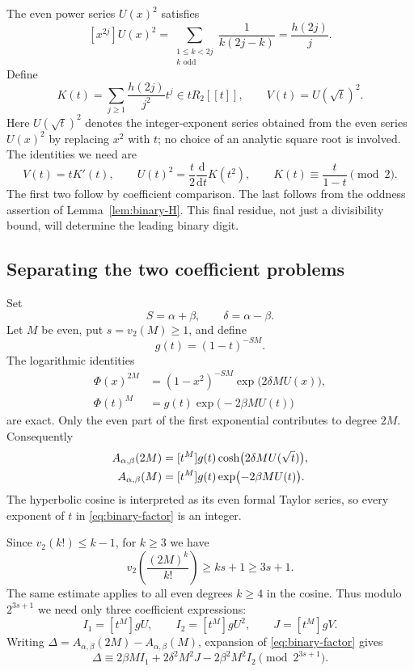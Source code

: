 \documentclass[11pt,a4paper]{article}
\numberwithin{equation}{section}
\theoremstyle{definition}
\theoremstyle{remark}
\newcommand{\A}{A_{\alpha,\beta}}
\begin{document}
The even power series $U(x)^2$ satisfies
\[
 [x^{2j}]U(x)^2
 =\sum_{\substack{1\le k<2j\\k\text{ odd}}}\frac1{k(2j-k)}
 =\frac{h(2j)}j.
\]
Define
\begin{equation}\label{eq:K}
 K(t)=\sum_{j\ge1}\frac{h(2j)}{j^2}t^j\in tR_2[[t]],
 \qquad V(t)=U(\sqrt t)^2.
\end{equation}
Here $U(\sqrt t)^2$ denotes the integer-exponent series obtained from the
even series $U(x)^2$ by replacing $x^2$ with $t$; no choice of an analytic
square root is involved. The identities we need are
\begin{equation}\label{eq:K-identities}
 V(t)=tK'(t),\qquad
 U(t)^2=\frac t2\frac{\mathrm d}{\mathrm dt}K(t^2),\qquad
 K(t)\equiv\frac{t}{1-t}\pmod2.
\end{equation}
The first two follow by coefficient comparison. The last follows from the
oddness assertion of Lemma~\ref{lem:binary-H}. This final residue, not just
a divisibility bound, will determine the leading binary digit.

\subsection{Separating the two coefficient problems}
Set
\[
 S=\alpha+\beta,\qquad \delta=\alpha-\beta.
\]
Let $M$ be even, put $s=v_2(M)\ge1$, and define
\[
 g(t)=(1-t)^{-SM}.
\]
The logarithmic identities
\begin{align*}
 \Phi(x)^{2M}&=(1-x^2)^{-SM}\exp\bigl(2\delta M U(x)\bigr),\\
 \Phi(t)^M&=g(t)\exp\bigl(-2\beta M U(t)\bigr)
\end{align*}
are exact. Only the even part of the first exponential contributes to degree
$2M$. Consequently
\begin{align}\label{eq:binary-factor}
 \A(2M)&=[t^M]g(t)\cosh\bigl(2\delta M U(\sqrt t)\bigr),\notag\\
 \A(M)&=[t^M]g(t)\exp\bigl(-2\beta M U(t)\bigr).
\end{align}
The hyperbolic cosine is interpreted as its even formal Taylor series,
so every exponent of $t$ in \eqref{eq:binary-factor} is an integer.

Since $v_2(k!)\le k-1$, for $k\ge3$ we have
\[
 v_2\left(\frac{(2M)^k}{k!}\right)\ge ks+1\ge3s+1.
\]
The same estimate applies to all even degrees $k\ge4$ in the cosine.
Thus modulo $2^{3s+1}$ we need only three coefficient expressions:
\begin{equation}\label{eq:I-def}
 I_1=[t^M]gU,\qquad I_2=[t^M]gU^2,\qquad J=[t^M]gV.
\end{equation}
Writing $\Delta=\A(2M)-\A(M)$, expansion of
\eqref{eq:binary-factor} gives
\begin{equation}\label{eq:delta-start}
 \Delta\equiv
 2\beta M I_1+2\delta^2M^2J-2\beta^2M^2I_2
 \pmod{2^{3s+1}}.
\end{equation}
\end{document}
